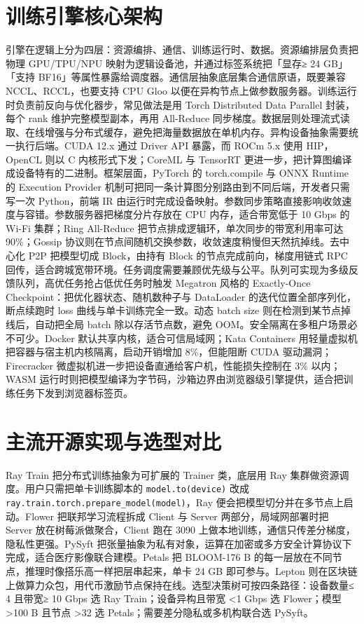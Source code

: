 \chapter{训练引擎核心架构}
引擎在逻辑上分为四层：资源编排、通信、训练运行时、数据。资源编排层负责把物理 GPU/TPU/NPU 映射为逻辑设备池，并通过标签系统把「显存≥ 24 GB」「支持 BF16」等属性暴露给调度器。通信层抽象底层集合通信原语，既要兼容 NCCL、RCCL，也要支持 CPU Gloo 以便在异构节点上做参数服务器。训练运行时负责前反向与优化器步，常见做法是用 Torch Distributed Data Parallel 封装，每个 rank 维护完整模型副本，再用 All-Reduce 同步梯度。数据层则处理流式读取、在线增强与分布式缓存，避免把海量数据放在单机内存。异构设备抽象需要统一执行后端。CUDA 12.x 通过 Driver API 暴露，而 ROCm 5.x 使用 HIP，OpenCL 则以 C 内核形式下发；CoreML 与 TensorRT 更进一步，把计算图编译成设备特有的二进制。框架层面，PyTorch 的 torch.compile 与 ONNX Runtime 的 Execution Provider 机制可把同一条计算图分别路由到不同后端，开发者只需写一次 Python，前端 IR 由运行时完成设备映射。参数同步策略直接影响收敛速度与容错。参数服务器把梯度分片存放在 CPU 内存，适合带宽低于 10 Gbps 的 Wi-Fi 集群；Ring All-Reduce 把节点排成逻辑环，单次同步的带宽利用率可达 90\%{}；Gossip 协议则在节点间随机交换参数，收敛速度稍慢但天然抗掉线。去中心化 P2P 把模型切成 Block，由持有 Block 的节点完成前向，梯度用链式 RPC 回传，适合跨城宽带环境。任务调度需要兼顾优先级与公平。队列可实现为多级反馈队列，高优任务抢占低优任务时触发 Megatron 风格的 Exactly-Once Checkpoint：把优化器状态、随机数种子与 DataLoader 的迭代位置全部序列化，断点续跑时 loss 曲线与单卡训练完全一致。动态 batch size 则在检测到某节点掉线后，自动把全局 batch 除以存活节点数，避免 OOM。安全隔离在多租户场景必不可少。Docker 默认共享内核，适合可信局域网；Kata Containers 用轻量虚拟机把容器与宿主机内核隔离，启动开销增加 8\%{}，但能阻断 CUDA 驱动漏洞；Firecracker 微虚拟机进一步把设备直通给客户机，性能损失控制在 3\%{} 以内；WASM 运行时则把模型编译为字节码，沙箱边界由浏览器级引擎提供，适合把训练任务下发到浏览器标签页。\par
\chapter{主流开源实现与选型对比}
Ray Train 把分布式训练抽象为可扩展的 Trainer 类，底层用 Ray 集群做资源调度。用户只需把单卡训练脚本的 \texttt{model.to(device)} 改成 \texttt{ray.train.torch.prepare\_{}model(model)}，Ray 便会把模型切分并在多节点上启动。Flower 把联邦学习流程拆成 Client 与 Server 两部分，局域网部署时把 Server 放在树莓派做聚合，Client 跑在 3090 上做本地训练，通信只传差分梯度，隐私性更强。PySyft 把张量抽象为私有对象，运算在加密或多方安全计算协议下完成，适合医疗影像联合建模。Petals 把 BLOOM-176 B 的每一层放在不同节点，推理时像搭乐高一样把层串起来，单卡 24 GB 即可参与。Lepton 则在区块链上做算力众包，用代币激励节点保持在线。选型决策树可按四条路径：设备数量≤ 4 且带宽≥ 10 Gbps 选 Ray Train；设备异构且带宽 <1 Gbps 选 Flower；模型 >100 B 且节点 >32 选 Petals；需要差分隐私或多机构联合选 PySyft。\par
